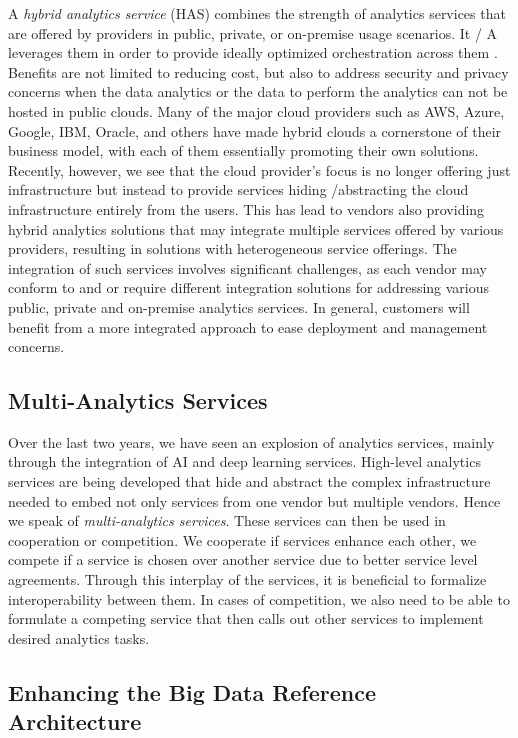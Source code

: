A {\em hybrid analytics service} (HAS) combines the strength of analytics
services that are offered by providers in public, private, or
on-premise usage scenarios. It / A \TODO{[HAS]} leverages them \TODO{[x]} in order to provide ideally optimized
orchestration across them \TODO{[x]}. Benefits are not limited to reducing cost,
but also to address security and privacy concerns when the data
analytics or the data to perform the analytics can not be hosted in
public clouds. Many of the major cloud providers such as AWS, Azure,
Google, IBM, Oracle, and others have made hybrid clouds a cornerstone
of their business model, with each of them essentially promoting their own
solutions. Recently, however, we see that the cloud provider's focus is no longer
offering just infrastructure but instead to provide services hiding /abstracting the
cloud infrastructure entirely from the users. 
This has lead to vendors
also providing hybrid analytics solutions that may integrate
multiple services offered by various providers, resulting in solutions
with heterogeneous service offerings. The integration of such services
involves significant challenges, as each vendor may conform to and or require different
integration solutions for addressing various public, private and on-premise
analytics services. In general, customers will benefit from a more
integrated approach to ease deployment and management concerns.

\subsection{Multi-Analytics Services}

Over the last two years, we have seen an explosion of analytics
services, mainly through the integration of AI and deep learning
services. High-level analytics services are being developed that hide
and abstract the complex infrastructure needed to embed not only
services from one vendor but multiple vendors. Hence we speak of {\em
multi-analytics services}. These services can then be used in
cooperation or competition. We cooperate if services enhance each
other, we compete if a service is chosen over another service due to
better service level agreements. Through this interplay of the
services, it is beneficial to formalize interoperability between
them. In cases of competition, we also need to be able to formulate a
competing service that then calls out other services to implement
desired analytics tasks.

\subsection{Enhancing the Big Data Reference Architecture}
\label{s:arch}

